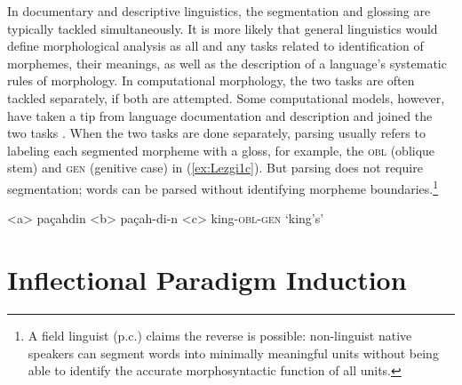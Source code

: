 In documentary and descriptive linguistics, the segmentation and glossing are typically tackled simultaneously. It is more likely that general linguistics would define morphological analysis as all and any tasks related to identification of morphemes, their meanings, as well as the description of a language’s systematic rules of morphology. In computational morphology, the two tasks are often tackled separately, if both are attempted. Some computational models, however, have taken a tip from language documentation and description and joined the two tasks
\citep{cotterell_labeled_2015}. When the two tasks are done separately, parsing usually refers to labeling each segmented morpheme with a gloss, for example, the \textsc{obl} (oblique stem) and \textsc{gen} (genitive case) in (\ref{ex:Lezgi1c}). But parsing does not require segmentation;
words can be parsed without identifying morpheme boundaries.\footnote{A field linguist (p.c.) claims the reverse is possible: non-linguist native speakers can segment words into minimally meaningful units without being able to identify the accurate morphosyntactic function of all units.}

\begin{singlespace}

\label{ex:Lezgi1}
\a<a> pa\c{c}ahdin
\label{ex:Lezgi1a}
\a<b> pa\c{c}ah-di-n
\label{ex:Lezgi1b}
\a<c> king-\textsc{obl}-\textsc{gen}
\label{ex:Lezgi1c}
\a `king's'
\label{ex:Lezgi1d}
\xe

\end{singlespace}



\section{Inflectional Paradigm Induction}

